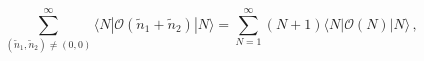 \begin{equation}
 \sum_{(\tilde{n}_1,\tilde{n}_2)\neq (0,0)}^{\infty} 
   \langle N|\mathcal{O}(\tilde{n}_1+\tilde{n}_2)|N
\rangle =\sum_{N=1}^{\infty}(N+1)
\langle N|\mathcal{O}(N)|N\rangle\,,\label{eq:4.1.18}
\end{equation}

